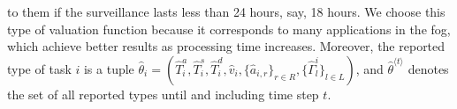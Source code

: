 \documentclass[11pt]{phdthesis}
\begin{document}
to them if the surveillance lasts less than 24 hours, say, 18 hours. We choose this type of valuation function because it corresponds to many applications in the fog, which achieve better results as processing time increases. Moreover, the reported type of task $i$ is a tuple $\hat{\theta}_i = (\hat{T}_i^a, \hat{T}_i^s, \hat{T}_i^d, \hat{v}_i, \{ \hat{a}_{i,r} \}_{r \in R}, \{ \hat{\Gamma}_l^i \}_{l \in L})$, and $ \hat{\theta}^{\langle t \rangle} $ denotes the set of all reported types until and including time step $ t $. 

\end{document}
